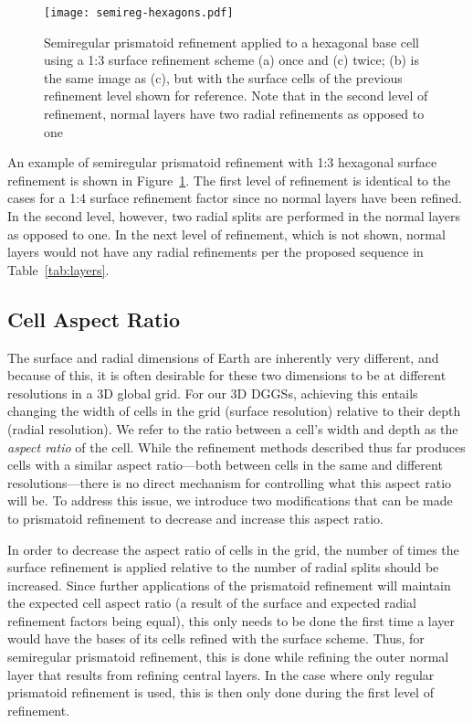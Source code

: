 \begin{figure}[ht!]
	\centering
	\texttt{[image: semireg-hexagons.pdf]}
	\caption[Semiregular prismatoid refinement for hexagons]{
		Semiregular prismatoid refinement applied to a hexagonal base cell using a 1:3 surface refinement scheme (a) once and (c) twice; (b) is the same image as (c), but with the surface cells of the previous refinement level shown for reference.
		Note that in the second level of refinement, normal layers have two radial refinements as opposed to one
	}
	\label{fig:hexagons}
\end{figure}


An example of semiregular prismatoid refinement with 1:3 hexagonal surface refinement is shown in Figure~\ref{fig:hexagons}.
The first level of refinement is identical to the cases for a 1:4 surface refinement factor since no normal layers have been refined.
In the second level, however, two radial splits are performed in the normal layers as opposed to one.
In the next level of refinement, which is not shown, normal layers would not have any radial refinements per the proposed sequence in Table~\ref{tab:layers}.


\subsection{Cell Aspect Ratio} \label{chap:5:ar}
The surface and radial dimensions of Earth are inherently very different, and because of this, it is often desirable for these two dimensions to be at different resolutions in a 3D global grid.
For our 3D DGGSs, achieving this entails changing the width of cells in the grid (surface resolution) relative to their depth (radial resolution).
We refer to the ratio between a cell's width and depth as the \textit{aspect ratio} of the cell.
While the refinement methods described thus far produces cells with a similar aspect ratio---both between cells in the same and different resolutions---there is no direct mechanism for controlling what this aspect ratio will be.
To address this issue, we introduce two modifications that can be made to prismatoid refinement to decrease and increase this aspect ratio.


In order to decrease the aspect ratio of cells in the grid, the number of times the surface refinement is applied relative to the number of radial splits should be increased.
Since further applications of the prismatoid refinement will maintain the expected cell aspect ratio (a result of the surface and expected radial refinement factors being equal), this only needs to be done the first time a layer would have the bases of its cells refined with the surface scheme.
Thus, for semiregular prismatoid refinement, this is done while refining the outer normal layer that results from refining central layers.
In the case where only regular prismatoid refinement is used, this is then only done during the first level of refinement.


